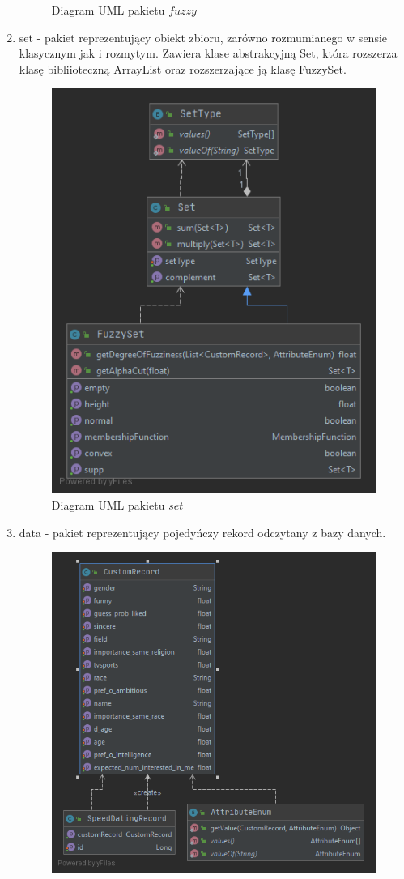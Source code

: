 \documentclass{classrep}
\begin{document}
\begin{enumerate}
\begin{figure}[H]
    \caption{Diagram UML pakietu \(fuzzy\)}
  \end{figure}
  \item set - pakiet reprezentujący obiekt zbioru, zarówno rozmumianego w sensie klasycznym jak i rozmytym. Zawiera klase abstrakcyjną Set, która rozszerza klasę bibliioteczną ArrayList oraz rozszerzające ją klasę FuzzySet.
  \begin{figure}[H]
    \centering
    \includegraphics[scale = 0.7]{set}
    \caption{Diagram UML pakietu \(set\)}
  \end{figure}
  \item data - pakiet reprezentujący pojedyńczy rekord odczytany z bazy danych.
   \begin{figure}[H]
    \centering
    \includegraphics[scale = 0.7]{data}

\end{figure}
\end{enumerate}
\end{document}
